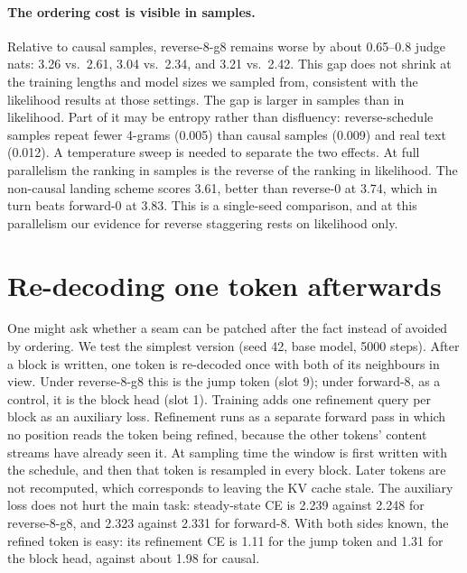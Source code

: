 \documentclass[11pt]{article}
\theoremstyle{definition}
\theoremstyle{remark}
\newcommand{\sch}[1]{\textsf{#1}}
\begin{document}
\paragraph{The ordering cost is visible in samples.}
Relative to causal samples, \sch{reverse-8-g8} remains worse by about 0.65--0.8 judge nats: 3.26 vs.\ 2.61, 3.04 vs.\ 2.34, and 3.21 vs.\ 2.42.
This gap does not shrink at the training lengths and model sizes we sampled from, consistent with the likelihood results at those settings.
The gap is larger in samples than in likelihood.
Part of it may be entropy rather than disfluency: reverse-schedule samples repeat fewer 4-grams (0.005) than causal samples (0.009) and real text (0.012).
A temperature sweep is needed to separate the two effects.
At full parallelism the ranking in samples is the reverse of the ranking in likelihood.
The non-causal \sch{landing} scheme scores 3.61, better than \sch{reverse-0} at 3.74, which in turn beats \sch{forward-0} at 3.83.
This is a single-seed comparison, and at this parallelism our evidence for reverse staggering rests on likelihood only.

\section{Re-decoding one token afterwards}
\label{app:refine}
One might ask whether a seam can be patched after the fact instead of avoided by ordering.
We test the simplest version (seed 42, base model, 5000 steps).
After a block is written, one token is re-decoded once with both of its neighbours in view.
Under \sch{reverse-8-g8} this is the jump token (slot 9); under \sch{forward-8}, as a control, it is the block head (slot 1).
Training adds one refinement query per block as an auxiliary loss.
Refinement runs as a separate forward pass in which no position reads the token being refined, because the other tokens' content streams have already seen it.
At sampling time the window is first written with the schedule, and then that token is resampled in every block.
Later tokens are not recomputed, which corresponds to leaving the KV cache stale.
The auxiliary loss does not hurt the main task: steady-state CE is 2.239 against 2.248 for \sch{reverse-8-g8}, and 2.323 against 2.331 for \sch{forward-8}.
With both sides known, the refined token is easy: its refinement CE is 1.11 for the jump token and 1.31 for the block head, against about 1.98 for causal.
\end{document}

